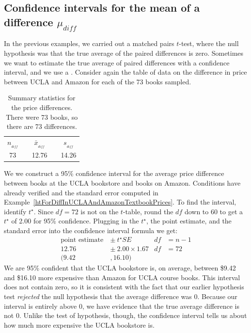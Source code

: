 \subsection{Confidence intervals for the mean of a difference $\mu_{diff}$}

In the previous examples, we carried out a matched pairs $t$-test, where the null hypothesis was that the true average of the paired differences is zero. Sometimes we want to estimate the true average of paired differences with a confidence interval, and we use a . Consider again the table of data on the difference in price between UCLA and Amazon for each of the 73 books sampled.

\begin{table}[hh]
\centering
\begin{tabular}{ccccc}
\hline
$n_{_{diff}}$	&\hspace{3mm}& $\bar{x}_{_{diff}}$	&\hspace{3mm}& $s_{_{diff}}$ \vspace{1mm}\\
73			&& 12.76				&& 14.26 \\
\hline
\end{tabular}
\caption{Summary statistics for the price differences. There were 73 books, so there are 73 differences.}
\label{textbooksSummaryStatsAgain}
\end{table}

We we construct a 95\% confidence interval for the average price difference between books at the UCLA bookstore and books on Amazon. Conditions have already verified and the standard error computed in Example~\ref{htForDiffInUCLAAndAmazonTextbookPrices}. To find the interval, identify $t
^{\star}$. Since $df = 72$ is not on the $t$-table, round the $df$ down to 60 to get a $t^{\star}$ of 2.00  for 95\% confidence. Plugging in the $t^{\star}$, the point estimate, and the standard error into the confidence interval formula we get:
\begin{align*}
\text{point estimate} \ &\pm\ t^{\star}SE
	&df&=n-1\\
12.76 \ &\pm\ 2.00\times 1.67
	&df&=72\\
(9.42 &, 16.10)
\end{align*}
We are 95\% confident that the UCLA bookstore is, on average, between \$9.42 and \$16.10 more expensive than Amazon for UCLA course books. This interval does not contain zero, so it is consistent with the fact that our earlier hypothesis test \emph{rejected} the null hypothesis that the average difference was 0. Because our interval is entirely above 0, we have evidence that the true average difference is not 0. Unlike the test of hypothesis, though, the confidence interval tells us about how much more expensive the UCLA bookstore is.

